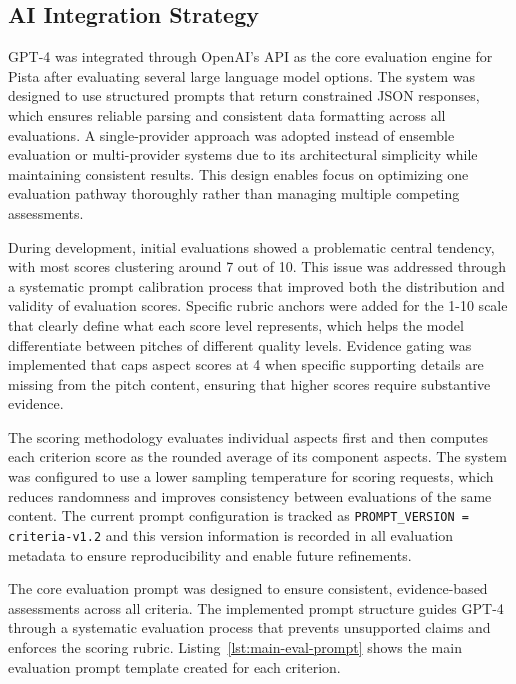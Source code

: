 \subsection{AI Integration Strategy}\label{subsec:ai-integration-strategy}
GPT-4 was integrated through OpenAI's API as the core evaluation engine for Pista after evaluating several large language model options. The system was designed to use structured prompts that return constrained JSON responses, which ensures reliable parsing and consistent data formatting across all evaluations. A single-provider approach was adopted instead of ensemble evaluation or multi-provider systems due to its architectural simplicity while maintaining consistent results. This design enables focus on optimizing one evaluation pathway thoroughly rather than managing multiple competing assessments.

During development, initial evaluations showed a problematic central tendency, with most scores clustering around 7 out of 10. This issue was addressed through a systematic prompt calibration process that improved both the distribution and validity of evaluation scores. Specific rubric anchors were added for the 1-10 scale that clearly define what each score level represents, which helps the model differentiate between pitches of different quality levels. Evidence gating was implemented that caps aspect scores at 4 when specific supporting details are missing from the pitch content, ensuring that higher scores require substantive evidence.

The scoring methodology evaluates individual aspects first and then computes each criterion score as the rounded average of its component aspects. The system was configured to use a lower sampling temperature for scoring requests, which reduces randomness and improves consistency between evaluations of the same content. The current prompt configuration is tracked as \texttt{PROMPT\_VERSION = criteria\textrm{-}v1.2} and this version information is recorded in all evaluation metadata to ensure reproducibility and enable future refinements.

The core evaluation prompt was designed to ensure consistent, evidence-based assessments across all criteria. The implemented prompt structure guides GPT-4 through a systematic evaluation process that prevents unsupported claims and enforces the scoring rubric. Listing~\ref{lst:main-eval-prompt} shows the main evaluation prompt template created for each criterion.


